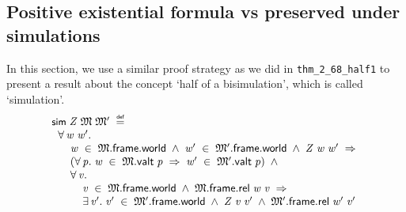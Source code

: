 \documentclass[letterpaper]{article}
\renewcommand{\HOLConst}[1]{{\textsf{\upshape\small #1}}}
\newenvironment{holmath}{\begin{displaymath}\begin{array}{l}}{\end{array}\end{displaymath}\ignorespacesafterend}
\begin{document}
\subsection{Positive existential formula vs preserved under simulations}
In this section, we use a similar proof strategy as we did in \texttt{thm_2_68_half1} to present a result about the concept `half of a bisimulation', which is called `simulation'.
\begin{holmath}
  \HOLConst{sim}\;\HOLFreeVar{Z}\;\HOLFreeVar{\ensuremath{\mathfrak{M}}}\;\HOLFreeVar{\ensuremath{\mathfrak{M}'}}\;\HOLSymConst{\HOLTokenDefEquality{}}\\
\;\;\HOLSymConst{\HOLTokenForall{}}\HOLBoundVar{w}\;\HOLBoundVar{w\sp{\prime}}.\\
\;\;\;\;\;\;\HOLBoundVar{w}\;\HOLSymConst{\HOLTokenIn{}}\;\HOLFreeVar{\ensuremath{\mathfrak{M}}}.\HOLFieldName{frame}.\HOLFieldName{world}\;\HOLSymConst{\HOLTokenConj{}}\;\HOLBoundVar{w\sp{\prime}}\;\HOLSymConst{\HOLTokenIn{}}\;\HOLFreeVar{\ensuremath{\mathfrak{M}'}}.\HOLFieldName{frame}.\HOLFieldName{world}\;\HOLSymConst{\HOLTokenConj{}}\;\HOLFreeVar{Z}\;\HOLBoundVar{w}\;\HOLBoundVar{w\sp{\prime}}\;\HOLSymConst{\HOLTokenImp{}}\\
\;\;\;\;\;\;(\HOLSymConst{\HOLTokenForall{}}\HOLBoundVar{p}.\;\HOLBoundVar{w}\;\HOLSymConst{\HOLTokenIn{}}\;\HOLFreeVar{\ensuremath{\mathfrak{M}}}.\HOLFieldName{valt}\;\HOLBoundVar{p}\;\HOLSymConst{\HOLTokenImp{}}\;\HOLBoundVar{w\sp{\prime}}\;\HOLSymConst{\HOLTokenIn{}}\;\HOLFreeVar{\ensuremath{\mathfrak{M}'}}.\HOLFieldName{valt}\;\HOLBoundVar{p})\;\HOLSymConst{\HOLTokenConj{}}\\
\;\;\;\;\;\;\HOLSymConst{\HOLTokenForall{}}\HOLBoundVar{v}.\\
\;\;\;\;\;\;\;\;\;\;\HOLBoundVar{v}\;\HOLSymConst{\HOLTokenIn{}}\;\HOLFreeVar{\ensuremath{\mathfrak{M}}}.\HOLFieldName{frame}.\HOLFieldName{world}\;\HOLSymConst{\HOLTokenConj{}}\;\HOLFreeVar{\ensuremath{\mathfrak{M}}}.\HOLFieldName{frame}.\HOLFieldName{rel}\;\HOLBoundVar{w}\;\HOLBoundVar{v}\;\HOLSymConst{\HOLTokenImp{}}\\
\;\;\;\;\;\;\;\;\;\;\HOLSymConst{\HOLTokenExists{}}\HOLBoundVar{v\sp{\prime}}.\;\HOLBoundVar{v\sp{\prime}}\;\HOLSymConst{\HOLTokenIn{}}\;\HOLFreeVar{\ensuremath{\mathfrak{M}'}}.\HOLFieldName{frame}.\HOLFieldName{world}\;\HOLSymConst{\HOLTokenConj{}}\;\HOLFreeVar{Z}\;\HOLBoundVar{v}\;\HOLBoundVar{v\sp{\prime}}\;\HOLSymConst{\HOLTokenConj{}}\;\HOLFreeVar{\ensuremath{\mathfrak{M}'}}.\HOLFieldName{frame}.\HOLFieldName{rel}\;\HOLBoundVar{w\sp{\prime}}\;\HOLBoundVar{v\sp{\prime}}
\end{holmath}
\end{document}
